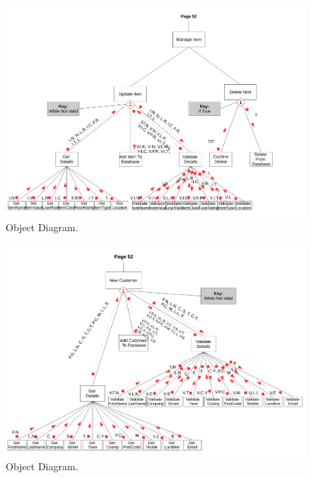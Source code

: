 \begin{landscape}
\newpage

\begin{figure}[H]
    \begin{center}
    \includegraphics[width=500px]{./Design/top_down_design/manage_items.pdf}
    \caption{Object Diagram.} \label{fig:object_diagram}
    \end{center}
\end{figure}

\newpage

\begin{figure}[H]
    \begin{center}
    \includegraphics[width=500px]{./Design/top_down_design/new_customer.pdf}
    \caption{Object Diagram.} \label{fig:object_diagram}
    \end{center}
\end{figure}


\end{landscape}
